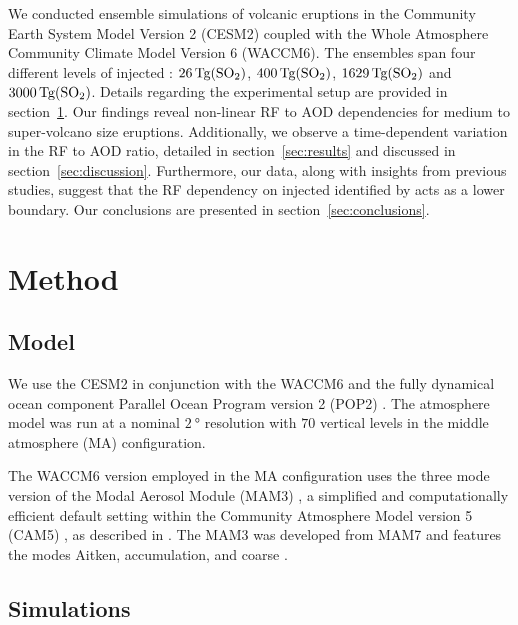 \documentclass[draft]{agujournal2019}
\begin{document}
  We conducted ensemble simulations of volcanic eruptions in the Community Earth System
  Model Version 2 (CESM2) coupled with the Whole Atmosphere Community Climate Model
  Version 6 (WACCM6). The ensembles span four different levels of injected :
  \(\SI{26}{\tera\gram(\ce{SO2})}\), \(\SI{400}{\tera\gram(\ce{SO2})}\),
  \(\SI{1629}{\tera\gram(\ce{SO2})}\) and \(\SI{3000}{\tera\gram(\ce{SO2})}\). Details
  regarding the experimental setup are provided in section~\ref{sec:method}. Our
  findings reveal non-linear RF to AOD dependencies for medium to super-volcano size
  eruptions. Additionally, we observe a time-dependent variation in the RF to AOD ratio,
  detailed in section~\ref{sec:results} and discussed in section~\ref{sec:discussion}.
  Furthermore, our data, along with insights from previous studies, suggest that the RF
  dependency on injected  identified by  acts as a lower
  boundary. Our conclusions are presented in section~\ref{sec:conclusions}.

  \section{Method}

  \label{sec:method}


  \subsection{Model}

  We use the CESM2 \cite{danabasoglu2020} in conjunction with the WACCM6
  \cite{gettleman2019} and the fully dynamical ocean component Parallel Ocean Program
  version 2 (POP2) \cite{smith2010, danabasoglu2020}. The atmosphere model was run at a
  nominal \(\SI{2}{\degree}\) resolution with \(70\) vertical levels in the middle
  atmosphere (MA) configuration.

  The WACCM6 version employed in the MA configuration uses the three mode version of the
  Modal Aerosol Module (MAM3) \cite{gettleman2019}, a simplified and computationally
  efficient default setting within the Community Atmosphere Model version 5 (CAM5)
  \cite{liu2016}, as described in . The MAM3 was developed from MAM7 and
  features the modes Aitken, accumulation, and coarse \cite{liu2016}.

  \subsection{Simulations}
\end{document}
